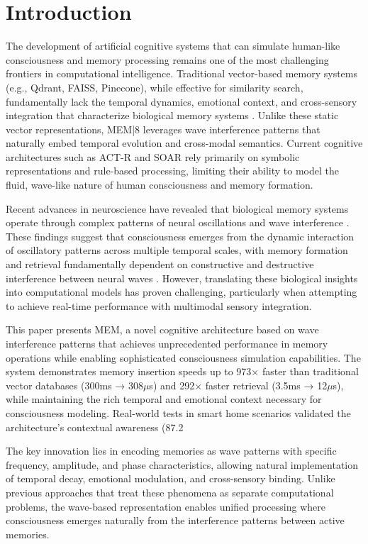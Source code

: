 \documentclass[11pt,letterpaper]{article}
\begin{document}
\section{Introduction}

The development of artificial cognitive systems that can simulate human-like consciousness and memory processing remains one of the most challenging frontiers in computational intelligence. Traditional vector-based memory systems (e.g., Qdrant, FAISS, Pinecone), while effective for similarity search, fundamentally lack the temporal dynamics, emotional context, and cross-sensory integration that characterize biological memory systems \cite{tulving1985memory, baddeley2012working}. Unlike these static vector representations, MEM|8 leverages wave interference patterns that naturally embed temporal evolution and cross-modal semantics. Current cognitive architectures such as ACT-R \cite{anderson2004integrated} and SOAR \cite{laird2012soar} rely primarily on symbolic representations and rule-based processing, limiting their ability to model the fluid, wave-like nature of human consciousness and memory formation.

Recent advances in neuroscience have revealed that biological memory systems operate through complex patterns of neural oscillations and wave interference \cite{buzsaki2006rhythms, fries2015rhythms}. These findings suggest that consciousness emerges from the dynamic interaction of oscillatory patterns across multiple temporal scales, with memory formation and retrieval fundamentally dependent on constructive and destructive interference between neural waves \cite{jensen2007cross}. However, translating these biological insights into computational models has proven challenging, particularly when attempting to achieve real-time performance with multimodal sensory integration.

This paper presents MEM\hbar, a novel cognitive architecture based on wave interference patterns that achieves unprecedented performance in memory operations while enabling sophisticated consciousness simulation capabilities. The system demonstrates memory insertion speeds up to 973× faster than traditional vector databases (300ms → 308$\mu$s) and 292× faster retrieval (3.5ms → 12$\mu$s), while maintaining the rich temporal and emotional context necessary for consciousness modeling. Real-world tests in smart home scenarios validated the architecture's contextual awareness (87.2%

The key innovation lies in encoding memories as wave patterns with specific frequency, amplitude, and phase characteristics, allowing natural implementation of temporal decay, emotional modulation, and cross-sensory binding. Unlike previous approaches that treat these phenomena as separate computational problems, the wave-based representation enables unified processing where consciousness emerges naturally from the interference patterns between active memories.
\end{document}
